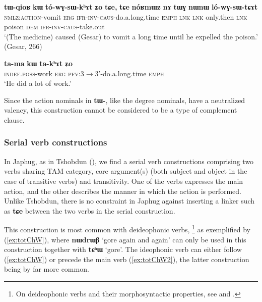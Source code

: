 \documentclass[oneside,a4paper,11pt]{article}
\newcommand{\ipa}[1]{\textbf{\phon#1}} %
\newcommand{\jpg}[2]{\ipa{#1} `#2'} %
\begin{document}
  \begin{exe}
\ex \label{ex:tWqioR}
\gll \ipa{tɯ-qioʁ}	\ipa{kɯ}	\ipa{tó-wɣ-sɯ-kʰɤt}	\ipa{ʑo}	\ipa{tɕe,}	\ipa{tɕe}	\ipa{nóʁmɯz}	\ipa{nɤ}	\ipa{tɯɣ}	\ipa{nɯnɯ}	\ipa{ló-wɣ-sɯ-tɕɤt} \\
\textsc{nmlz:action}-vomit \textsc{erg} \textsc{ifr-inv-caus}-do.a.long.time \textsc{emph} \textsc{lnk} \textsc{lnk} only.then \textsc{lnk} poison \textsc{dem} \textsc{ifr-inv-caus}-take.out \\
\glt `(The medicine) caused (Gesar) to vomit a long time until he expelled the poison.' (Gesar, 266)
\end{exe}

  \begin{exe}
\ex \label{ex:takhAt}
\gll 
\ipa{ta-ma}	\ipa{kɯ}	\ipa{ta-kʰɤt}	\ipa{ʑo} \\
\textsc{indef.poss}-work \textsc{erg} \textsc{pfv}:3$\rightarrow$3'-do.a.long.time \textsc{emph} \\
\glt  `He did a lot of work.'
\end{exe}

Since the action nominals in \ipa{tɯ-}, like the degree nominals, have a neutralized valency, this construction cannot be considered to be a type of complement clause.

\subsubsection{Serial verb constructions} \label{sec:serial}
In Japhug, as in Tshobdun (\citealt[490-1]{sun12complementation}), we find a serial verb constructions comprising two verbs sharing TAM category, core argument(s) (both subject and object in the case of transitive verbs) and transitivity. One of the verbs expresses the main action, and the other describes the manner in which the action is performed. Unlike Tshobdun, there is no constraint in Japhug against inserting a linker such as \ipa{tɕe} between the two verbs in the serial construction.

This construction is most common with deideophonic verbs, \footnote{On deideophonic verbs and their morphosyntactic properties, see \citet{jackson04zhuangmaoci} and \citet{japhug14ideophones}.} as exemplified by (\ref{ex:totChW}), where \jpg{nɯdrɯβ}{gore again and again} can only be used in this construction together with \jpg{tɕʰɯ}{gore}. The ideophonic verb can either follow (\ref{ex:totChW}) or precede  the main verb (\ref{ex:totChW2}), the latter construction being by far more common.
\end{document}
